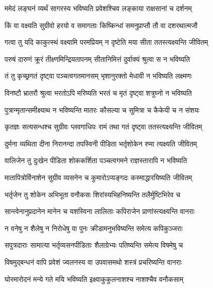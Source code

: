 \twolineshloka
{ममेदं लङ्घनं व्यर्थं सागरस्य भविष्यति}
{प्रवेशश्चिव लङ्काया राक्षसानां च दर्शनम्} %

\twolineshloka
{किं वा वक्ष्यति सुग्रीवो हरयो व समागताः}
{किष्किन्धां समनुप्राप्तौ तौ वा दशरथात्मजौ} %

\twolineshloka
{गत्वा तु यदि काकुत्स्थं वक्ष्यामि परमप्रियम्}
{न दृष्टेति मया सीता ततस्त्यक्ष्यन्ति जीवितम्} %

\twolineshloka
{परुषं दारुणं क्रूरं तीक्ष्णमिन्द्रियतापनम्}
{सीतानिमित्तं दुर्वाक्यं श्रुत्वा स न भविष्यति} %

\twolineshloka
{तं तु कृच्छ्रगतं दृष्ट्वा पञ्चत्वगतमानसम्}
{भृशानुरक्तो मेधावी न भविष्यति लक्ष्मणः} %

\twolineshloka
{विनष्टौ भ्रातरौ श्रुत्वा भरतोऽपि मरिष्यति}
{भरतं च मृतं दृष्ट्वा शत्रुघ्नो न भविष्यति} %

\twolineshloka
{पुत्रान्मृतान्समीक्ष्याथ न भविष्यन्ति मातरः}
{कौसल्या च सुमित्रा च कैकेयी च न संशयः} %

\twolineshloka
{कृतज्ञः सत्यसन्धश्च सुग्रीवः प्लवगाधिपः}
{रामं तथा गतं दृष्ट्वा ततस्त्यक्ष्यन्ति जीवितम्} %

\twolineshloka
{दुर्मना व्यथिता दीना निरानन्दा तपस्विनी}
{पीडिता भर्तृशोकेन रुमा त्यक्ष्यति जीवितम्} %

\twolineshloka
{वालिजेन तु दुःखेन पीडिता शोककर्शिता}
{पञ्चत्वगमने राज्ञस्तारापि न भविष्यति} %

\twolineshloka
{मातापित्रोर्विनाशेन सुग्रीव व्यसनेन च}
{कुमारोऽप्यङ्गदः कस्माद्धारयिष्यति जीवितम्} %

\twolineshloka
{भर्तृजेन तु शोकेन अभिभूता वनौकसः}
{शिरांस्यभिहनिष्यन्ति तलैर्मुष्टिभिरेव च} %

\twolineshloka
{सान्त्वेनानुप्रदानेन मानेन च यशस्विना}
{लालिताः कपिराजेन प्राणांस्त्यक्ष्यन्ति वानराः} %

\twolineshloka
{न वनेषु न शैलेषु न निरोधेषु वा पुनः}
{क्रीडामनुभविष्यन्ति समेत्य कपिकुञ्जराः} %

\twolineshloka
{सपुत्रदाराः सामात्या भर्तृव्यसनपीडिताः}
{शैलाग्रेभ्यः पतिष्यन्ति समेत्य विषमेषु च} %

\twolineshloka
{विषमुद्बन्धनं वापि प्रवेशं ज्वलनस्य वा}
{उपवासमथो शस्त्रं प्रचरिष्यन्ति वानराः} %

\twolineshloka
{घोरमारोदनं मन्ये गते मयि भविष्यति}
{इक्ष्वाकुकुलनाशश्च नाशश्चैव वनौकसाम्} %

